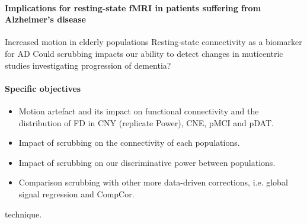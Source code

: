 \documentclass[authoryear]{elsarticle}
\begin{document}
\paragraph{Implications for resting-state fMRI in patients suffering from Alzheimer's disease} 
Increased motion in elderly populations
Resting-state connectivity as a biomarker for AD 
Could scrubbing impacts our ability to detect changes in muticentric studies investigating progression of dementia?


\paragraph{Specific objectives} 

\begin{itemize}
 \item Motion artefact and its impact on functional connectivity and the distribution of FD in CNY (replicate Power), CNE, pMCI and pDAT.
 \item Impact of scrubbing on the connectivity of each populations.
 \item Impact of scrubbing on our discriminative power between populations.
 \item Comparison scrubbing with other more data-driven corrections, i.e. global signal regression and CompCor.
\end{itemize}



technique. 
\end{document}
